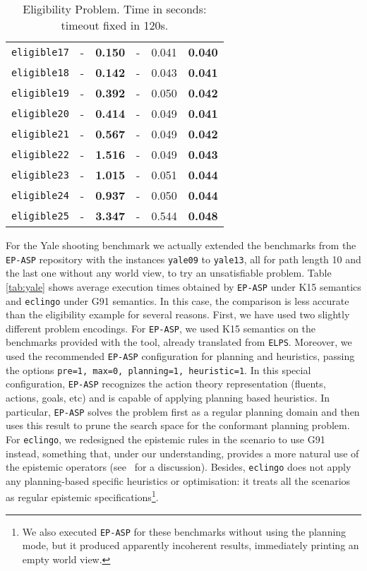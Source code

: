 \documentclass{new_tlp}
\def\eclingo{{\tt eclingo}}
\def\EPASP{{\tt EP-ASP}}
\begin{document}
\begin{table}[ht]
\begin{tabular}{c|cc|ccc}
\texttt{eligible17} & -       & \textbf{0.150}   & -                 & 0.041    & \textbf{0.040}  \\
\texttt{eligible18} & -       & \textbf{0.142}   & -                 & 0.043    & \textbf{0.041}  \\
\texttt{eligible19} & -       & \textbf{0.392}   & -                 & 0.050    & \textbf{0.042}  \\
\texttt{eligible20} & -       & \textbf{0.414}   & -                 & 0.049    & \textbf{0.041}  \\
\texttt{eligible21} & -       & \textbf{0.567}   & -                 & 0.049    & \textbf{0.042}  \\
\texttt{eligible22} & -       & \textbf{1.516}   & -                 & 0.049    & \textbf{0.043}  \\
\texttt{eligible23} & -       & \textbf{1.015}   & -                 & 0.051    & \textbf{0.044}  \\
\texttt{eligible24} & -       & \textbf{0.937}   & -                 & 0.050    & \textbf{0.044}  \\
\texttt{eligible25} & -       & \textbf{3.347}   & -                 & 0.544    & \textbf{0.048}  \\ \cline{1-6}
\end{tabular}
\caption{Eligibility Problem. Time in seconds: timeout fixed in 120s.}
\label{tab:eligible}
\end{table}

For the Yale shooting benchmark we actually extended the benchmarks from the \EPASP{} repository with the instances {\tt yale09} to {\tt yale13}, all for path length 10 and the last one without any world view, to try an unsatisfiable problem.
%
Table \ref{tab:yale} shows average execution times obtained by \EPASP{} under K15 semantics and \eclingo{} under G91 semantics. 
%
In this case, the comparison is less accurate than the eligibility example for several reasons. 
%
First, we have used two slightly different problem encodings. 
%
For \EPASP{}, we used K15 semantics on the benchmarks provided with the tool, already translated from {\tt ELPS}. Moreover, we used the recommended \EPASP{} configuration for planning and heuristics, passing the options {\tt pre=1, max=0, planning=1, heuristic=1}.
%
In this special configuration, \EPASP{} recognizes the action theory representation (fluents, actions, goals, etc) and is capable of applying planning based heuristics. In particular, \EPASP{} solves the problem first as a regular planning domain and then uses this result to prune the search space for the conformant planning problem. For \eclingo{}, we redesigned the epistemic rules in the scenario to use G91 instead, something that, under our understanding, provides a more natural use of the epistemic operators (see~ for a discussion). Besides, \eclingo{} does not apply any planning-based specific heuristics or optimisation: it treats all the scenarios as regular epistemic specifications\footnote{We also executed \EPASP{} for these benchmarks without using the planning mode, but it produced apparently incoherent results, immediately printing an empty world view.}.
\end{document}
